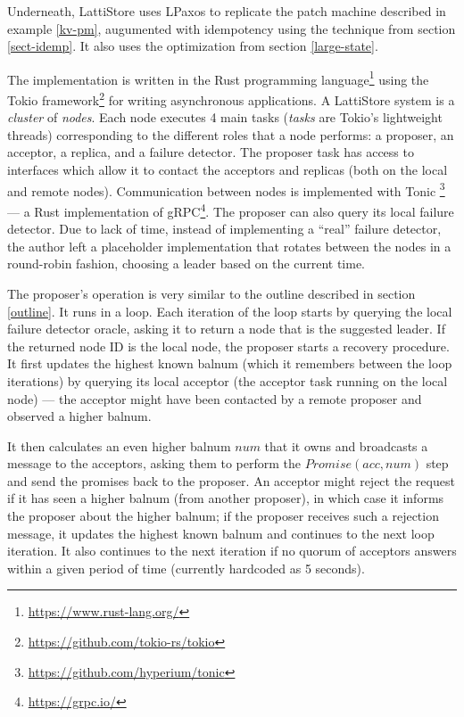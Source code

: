 \documentclass[12pt,a4paper,en]{pracamgr}
\newcommand{\ti}[1]{\textit{#1}}
\begin{document}
Underneath, LattiStore uses LPaxos to replicate the patch machine described in example \ref{kv-pm}, augumented with idempotency using the technique from section \ref{sect-idemp}. It also uses the optimization from section \ref{large-state}.

The implementation is written in the Rust programming language\footnote{\url{https://www.rust-lang.org/}} using the Tokio framework\footnote{\url{https://github.com/tokio-rs/tokio}} for writing asynchronous applications. A LattiStore system is a \ti{cluster} of \ti{nodes}. Each node executes 4 main tasks (\ti{tasks} are Tokio's lightweight threads) corresponding to the different roles that a node performs: a proposer, an acceptor, a replica, and a failure detector. The proposer task has access to interfaces which allow it to contact the acceptors and replicas (both on the local and remote nodes). Communication between nodes is implemented with Tonic \footnote{\url{https://github.com/hyperium/tonic}} --- a Rust implementation of gRPC\footnote{\url{https://grpc.io/}}. The proposer can also query its local failure detector. Due to lack of time, instead of implementing a ``real'' failure detector, the author left a placeholder implementation that rotates between the nodes in a round-robin fashion, choosing a leader based on the current time.

The proposer's operation is very similar to the outline described in section \ref{outline}. It runs in a loop. Each iteration of the loop starts by querying the local failure detector oracle, asking it to return a node that is the suggested leader. If the returned node ID is the local node, the proposer starts a recovery procedure. It first updates the highest known balnum (which it remembers between the loop iterations) by querying its local acceptor (the acceptor task running on the local node) --- the acceptor might have been contacted by a remote proposer and observed a higher balnum.

It then calculates an even higher balnum $num$ that it owns and broadcasts a message to the acceptors, asking them to perform the $Promise(acc, num)$ step and send the promises back to the proposer. An acceptor might reject the request if it has seen a higher balnum (from another proposer), in which case it informs the proposer about the higher balnum; if the proposer receives such a rejection message, it updates the highest known balnum and continues to the next loop iteration. It also continues to the next iteration if no quorum of acceptors answers within a given period of time (currently hardcoded as 5 seconds). 
\end{document}
